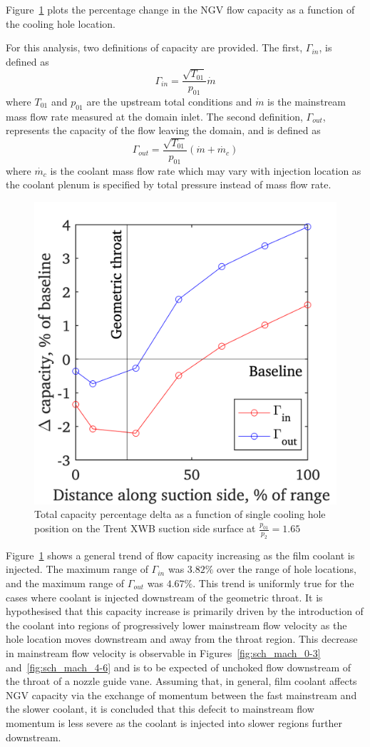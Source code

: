 \documentclass[a4paper, 11pt, oneside]{report}
\begin{document}
Figure~\ref{fig:sch_hole_location_vs_capacity} plots the percentage change in the NGV flow capacity as a function of the cooling hole location. 

For this analysis, two definitions of capacity are provided. The first, $\Gamma_{in}$, is defined as
\begin{equation}
\Gamma_{in} =
\frac{\sqrt{T_{01}}}{p_{01}}
\dot{m}
\end{equation}
where $T_{01}$ and $p_{01}$ are the upstream total conditions and $\dot{m}$ is the mainstream mass flow rate measured at the domain inlet. The second definition, $\Gamma_{out}$, represents the capacity of the flow leaving the domain, and is defined as
\begin{equation}
\Gamma_{out} =
\frac{\sqrt{T_{01}}}{p_{01}}
\left(
\dot{m}
+
\dot{m_c}
\right)
\end{equation}
where $\dot{m_c}$ is the coolant mass flow rate which may vary with injection location as the coolant plenum is specified by total pressure instead of mass flow rate.

\begin{figure}[H]
      \centering
      \includegraphics[width=.45\textwidth]{figs/sch_hole_location_vs_capacity.png}
      \caption{Total capacity percentage delta as a function of single cooling hole position on the Trent XWB suction side surface at $\frac{p_{01}}{p_2}=1.65$}
      \label{fig:sch_hole_location_vs_capacity}
\end{figure}

Figure~\ref{fig:sch_hole_location_vs_capacity} shows a general trend of flow capacity increasing as the film coolant is injected. The maximum range of $\Gamma_{in}$ was $3.82\%$ over the range of hole locations, and the maximum range of $\Gamma_{out}$ was $4.67\%$. This trend is uniformly true for the cases where coolant is injected downstream of the geometric throat. It is hypothesised that this capacity increase is primarily driven by the introduction of the coolant into regions of progressively lower mainstream flow velocity as the hole location moves downstream and away from the throat region. This decrease in mainstream flow velocity is observable in Figures~\ref{fig:sch_mach_0-3} and~\ref{fig:sch_mach_4-6} and is to be expected of unchoked flow downstream of the throat of a nozzle guide vane. Assuming that, in general, film coolant affects NGV capacity via the exchange of momentum between the fast mainstream and the slower coolant, it is concluded that this defecit to mainstream flow momentum is less severe as the coolant is injected into slower regions further downstream.
\end{document}
